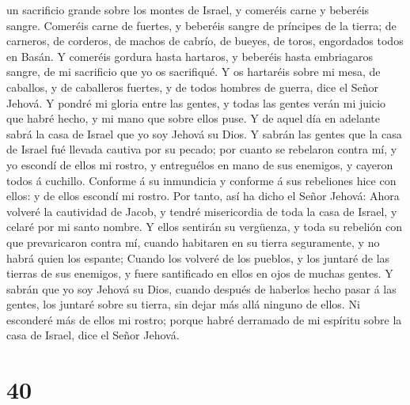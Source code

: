un sacrificio grande sobre los montes de Israel, y comeréis carne y
beberéis sangre.  Comeréis carne de fuertes, y beberéis
sangre de príncipes de la tierra; de carneros, de corderos, de machos de
cabrío, de bueyes, de toros, engordados todos en Basán.  Y
comeréis gordura hasta hartaros, y beberéis hasta embriagaros sangre, de
mi sacrificio que yo os sacrifiqué.  Y os hartaréis sobre
mi mesa, de caballos, y de caballeros fuertes, y de todos hombres de
guerra, dice el Señor Jehová.  Y pondré mi gloria entre las
gentes, y todas las gentes verán mi juicio que habré hecho, y mi mano
que sobre ellos puse.  Y de aquel día en adelante sabrá la
casa de Israel que yo soy Jehová su Dios.  Y sabrán las
gentes que la casa de Israel fué llevada cautiva por su pecado; por
cuanto se rebelaron contra mí, y yo escondí de ellos mi rostro, y
entreguélos en mano de sus enemigos, y cayeron todos á cuchillo.
 Conforme á su inmundicia y conforme á sus rebeliones hice
con ellos: y de ellos escondí mi rostro.  Por tanto, así ha
dicho el Señor Jehová: Ahora volveré la cautividad de Jacob, y tendré
misericordia de toda la casa de Israel, y celaré por mi santo nombre.
 Y ellos sentirán su vergüenza, y toda su rebelión con que
prevaricaron contra mí, cuando habitaren en su tierra seguramente, y no
habrá quien los espante;  Cuando los volveré de los
pueblos, y los juntaré de las tierras de sus enemigos, y fuere
santificado en ellos en ojos de muchas gentes.  Y sabrán
que yo soy Jehová su Dios, cuando después de haberlos hecho pasar á las
gentes, los juntaré sobre su tierra, sin dejar más allá ninguno de
ellos.  Ni esconderé más de ellos mi rostro; porque habré
derramado de mi espíritu sobre la casa de Israel, dice el Señor Jehová.

\hypertarget{section-39}{%
\section{40}\label{section-39}}

